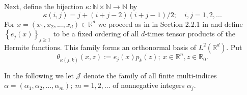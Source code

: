 \documentclass[12pt]{article}%
\numberwithin{equation}{section}
\def\R{\mathbb{R}}
\begin{document}
Next, define the bijection $\kappa :\mathbb{N}\times \mathbb{N}\longrightarrow
\mathbb{N}$\label{simb-new2} by
\begin{equation}
\kappa (i,j)=j+(i+j-2)(i+j-1)/2;\quad  i,j=1,2, ...
\end{equation}
For $x=(x_1, x_2, ... , x_d) \in \R^d$ we proceed as in in Section 2.2.1 in \cite{HOUZ} and define $\left\{ e _{j}(x)\right\} _{j\geq 1}$ to be a fixed ordering of all $d$-times tensor products of the Hermite functions.
This family forms an orthonormal basis of $L^2(\R^d).$
Put
\begin{equation}
\theta _{\kappa (j,k)}(x,z):=e _{j}(x)p_{k}(z); \  x\in \R^n, z \in \R_0.
\end{equation}

In the following we let $\mathcal{J}$ denote the family of all finite multi-indices $\alpha=(\alpha_1, \alpha_2, ..., \alpha_m); \ m=1,2, ...$ of nonnegative integers $\alpha_j$. 
\end{document}
